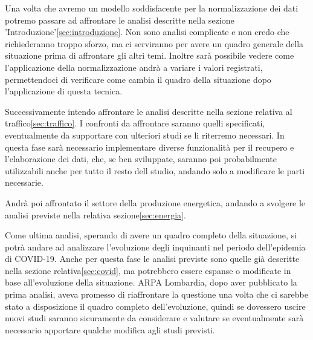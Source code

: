 \documentclass{article}
\begin{document}
Una volta che avremo un modello soddisfacente per la normalizzazione dei dati potremo passare ad affrontare le analisi descritte nella sezione 'Introduzione'\ref{sec:introduzione}. Non sono analisi complicate e non credo che richiederanno troppo sforzo, ma ci serviranno per avere un quadro generale della situazione prima di affrontare gli altri temi. Inoltre sarà possibile vedere come l'applicazione della normalizzazione andrà a variare i valori registrati, permettendoci di verificare come cambia il quadro della situazione dopo l'applicazione di questa tecnica.

Successivamente intendo affrontare le analisi descritte nella sezione relativa al traffico\ref{sec:traffico}. I confronti da affrontare saranno quelli specificati, eventualmente da supportare con ulteriori studi se li riterremo necessari. In questa fase sarà necessario implementare diverse funzionalità per il recupero e l'elaborazione dei dati, che, se ben sviluppate, saranno poi probabilmente utilizzabili anche per tutto il resto dell studio, andando solo a modificare le parti necessarie.

Andrà poi affrontato il settore della produzione energetica, andando a svolgere le analisi previste nella relativa sezione\ref{sec:energia}.

Come ultima analisi, sperando di avere un quadro completo della situazione, si potrà andare ad analizzare l'evoluzione degli inquinanti nel periodo dell'epidemia di COVID-19. Anche per questa fase le analisi previste sono quelle già descritte nella sezione relativa\ref{sec:covid}, ma potrebbero essere espanse o modificate in base all'evoluzione della situazione. ARPA Lombardia, dopo aver pubblicato la prima analisi\cite{arpaCovid}, aveva promesso di riaffrontare la questione una volta che ci sarebbe stato a disposizione il quadro completo dell'evoluzione, quindi se dovessero uscire nuovi studi saranno sicuramente da considerare e valutare se eventualmente sarà necessario apportare qualche modifica agli studi previsti. 
 

%
%
\label{bib-begin}
\printbibliography
\end{document}
